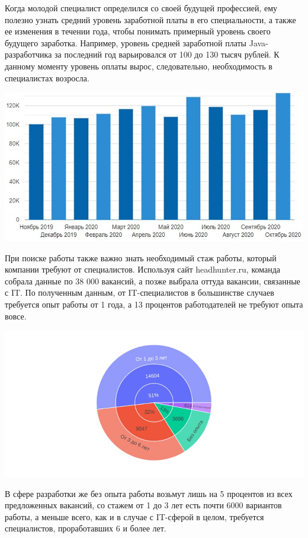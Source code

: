 \documentclass{article}
\begin{document}
Когда молодой специалист определился со своей будущей профессией, ему полезно узнать средний уровень заработной платы в его специальности, а также ее изменения в течении года, чтобы понимать примерный уровень своего будущего заработка. 
Например, уровень средней заработной платы Java-разработчика за последний год варьировался от 100 до 130 тысяч рублей. К данному моменту уровень оплаты вырос, следовательно, необходимость в специалистах возросла.

\includegraphics[width=\textwidth]{Images/5.jpg}

При поиске работы также важно знать необходимый стаж работы, который компании требуют от специалистов. Используя сайт headhunter.ru, команда собрала данные по 38 000 вакансий, а позже выбрала оттуда вакансии, связанные с IT. По полученным данным, от IT-специалистов в большинстве случаев требуется опыт работы от 1 года, а 13 процентов работодателей не требуют опыта вовсе.

\includegraphics[width=\textwidth]{Images/6.1.jpg}

В сфере разработки же без опыта работы возьмут лишь на 5 процентов из всех предложенных вакансий, со стажем от 1 до 3 лет есть почти 6000 вариантов работы, а меньше всего, как и в случае с IT-сферой в целом, требуется специалистов, проработавших 6 и более лет.   
\end{document}
